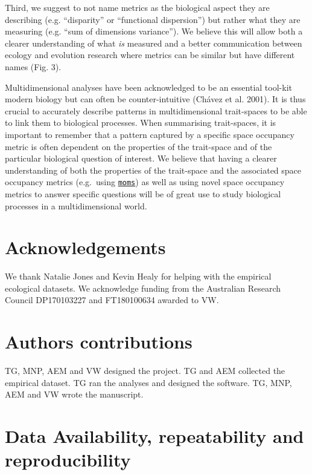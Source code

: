\documentclass[]{article}
\begin{document}
Third, we suggest to not name metrics as the biological aspect they are
describing (e.g. ``disparity'' or ``functional dispersion'') but rather
what they are measuring (e.g. ``sum of dimensions variance''). We
believe this will allow both a clearer understanding of what \emph{is}
measured and a better communication between ecology and evolution
research where metrics can be similar but have different names (Fig. 3).

Multidimensional analyses have been acknowledged to be an essential
tool-kit modern biology but can often be counter-intuitive (Chávez et
al. 2001). It is thus crucial to accurately describe patterns in
multidimensional trait-spaces to be able to link them to biological
processes. When summarising trait-spaces, it is important to remember
that a pattern captured by a specific space occupancy metric is often
dependent on the properties of the trait-space and of the particular
biological question of interest. We believe that having a clearer
understanding of both the properties of the trait-space and the
associated space occupancy metrics (e.g.~using
\href{https://tguillerme.shinyapps.io/moms/}{\texttt{moms}}) as well as
using novel space occupancy metrics to answer specific questions will be
of great use to study biological processes in a multidimensional world.

\section{Acknowledgements}\label{acknowledgements}

We thank Natalie Jones and Kevin Healy for helping with the empirical
ecological datasets. We acknowledge funding from the Australian Research
Council DP170103227 and FT180100634 awarded to VW.

\section{Authors contributions}\label{authors-contributions}

TG, MNP, AEM and VW designed the project. TG and AEM collected the
empirical dataset. TG ran the analyses and designed the software. TG,
MNP, AEM and VW wrote the manuscript.

\section{Data Availability, repeatability and
reproducibility}\label{data-availability-repeatability-and-reproducibility}
\end{document}
